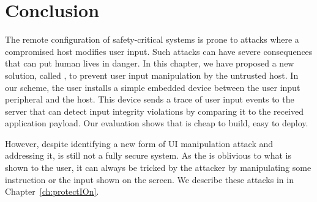 \section{Conclusion}
\label{sec:conclusion_IK}

The remote configuration of safety-critical systems is prone to attacks where a compromised host modifies user input. Such attacks can have severe consequences that can put human lives in danger. In this chapter, we have proposed a new solution, called \name, to prevent user input manipulation by the untrusted host. In our scheme, the user installs a simple embedded device between the user input peripheral and the host. This device sends a trace of user input events to the server that can detect input integrity violations by comparing it to the received application payload. Our evaluation shows that \name is cheap to build, easy to deploy.

However, despite identifying a new form of UI manipulation attack and addressing it, \integrikey is still not a fully secure system. As the \device is oblivious to what is shown to the user, it can always be tricked by the attacker by manipulating some instruction or the input shown on the screen. We describe these attacks in \protection in Chapter~\ref{ch:protectIOn}.
